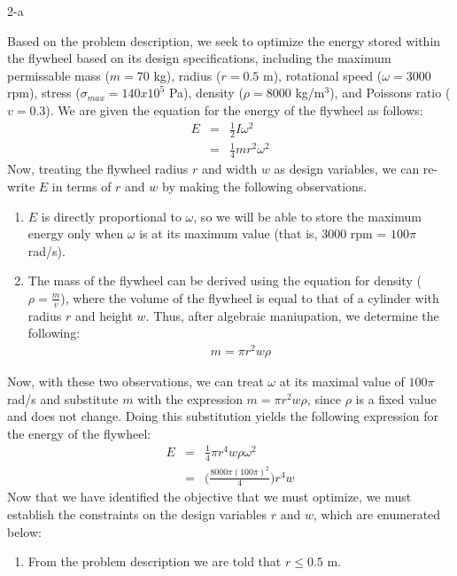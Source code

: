 \documentclass[11pt]{article}
\begin{document}
\begin{problem}{2-a}
\end{problem}
\begin{solution}

Based on the problem description, we seek to optimize the energy stored within the flywheel based on its design specifications, including the maximum permissable mass ($m = 70$ kg), radius ($r = 0.5$ m), rotational speed ($\omega = 3000$ rpm), stress ($\sigma_{max} = 140 x 10^5$ Pa), density ($\rho = 8000$ kg/m$^3$), and Poissons ratio ($v = 0.3$). We are given the equation for the energy of the flywheel as follows:
\begin{eqnarray*}
E & = & \frac{1}{2}I\omega^2 \\
& = & \frac{1}{4}mr^2\omega^2
\end{eqnarray*}
Now, treating the flywheel radius $r$ and width $w$ as design variables, we can re-write $E$ in terms of $r$ and $w$ by making the following observations.
\begin{enumerate}
	\item $E$ is directly proportional to $\omega$, so we will be able to store the maximum energy only when $\omega$ is at its maximum value (that is, $3000$ rpm = $100\pi$ rad/s).
	\item The mass of the flywheel can be derived using the equation for density ($\rho = \frac{m}{v}$), where the volume of the flywheel is equal to that of a cylinder with radius $r$ and height $w$. Thus, after algebraic maniupation, we determine the following:
\begin{eqnarray*}
m = \pi r^2 w \rho
\end{eqnarray*} 
\end{enumerate}
Now, with these two observations, we can treat $\omega$ at its maximal value of $100\pi$ rad/s and substitute $m$ with the expression $m = \pi r^2 w \rho$, since $\rho$ is a fixed value and does not change. Doing this substitution yields the following expression for the energy of the flywheel:
\begin{eqnarray*}
E & = & \frac{1}{4}\pi r^4 w \rho \omega^2 \\
& = & \Big(\frac{8000\pi(100\pi)^2}{4}\Big)r^4 w
\end{eqnarray*}
Now that we have identified the objective that we must optimize, we must establish the constraints on the design variables $r$ and $w$, which are enumerated below:
\begin{enumerate}
	\item From the problem description we are told that $r \leq 0.5$ m.

\end{enumerate}
\end{solution}
\end{document}

